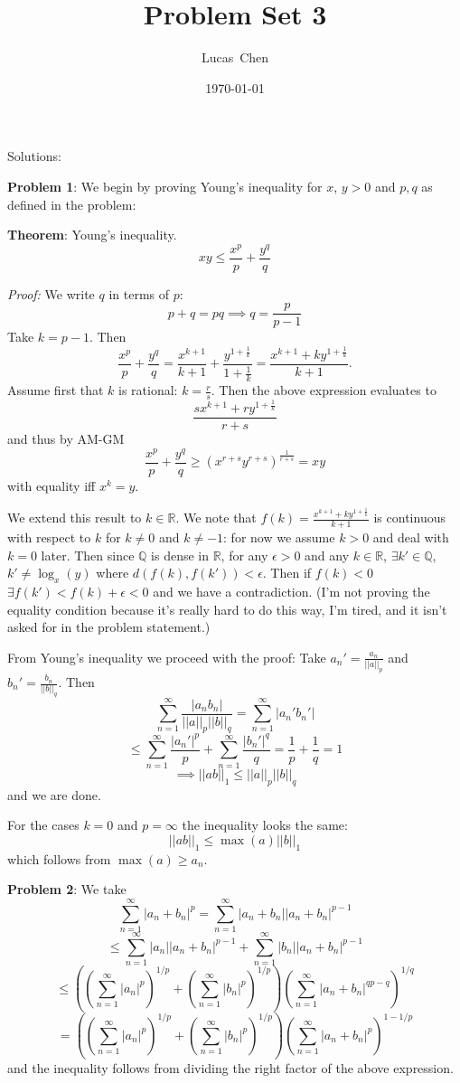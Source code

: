 \documentclass{amsart}
\title{Problem Set 3}
\author{Lucas\ Chen}
\date{\today}
\begin{document}
\maketitle

Solutions:

\medskip \noindent \textbf{Problem 1}:
We begin by proving Young's inequality for $x$, $y>0$ and $p, q$ as defined in the problem:

\medskip \noindent \textbf{Theorem}: Young's inequality. \[xy\leq\frac{x^p}{p}+\frac{y^q}{q}\]

\medskip \noindent \emph{Proof:}
We write $q$ in terms of $p$:
\[p+q=pq\implies q=\frac{p}{p-1}\]
Take $k=p-1$. Then \[\frac{x^p}{p}+\frac{y^q}{q}=\frac{x^{k+1}}{k+1}+\frac{y^{1+\frac{1}{k}}}{1+\frac{1}{k}}=\frac{x^{k+1}+ky^{1+\frac{1}{k}}}{k+1}.\]
Assume first that $k$ is rational: $k=\frac{r}{s}$. Then the above expression evaluates to \[\frac{sx^{k+1}+ry^{1+\frac{1}{k}}}{r+s}\]
and thus by AM-GM \[\frac{x^p}{p}+\frac{y^q}{q}\geq \left(x^{r+s}y^{r+s}\right)^{\frac{1}{r+s}}= xy\] with equality iff $x^k=y$. 

\medskip \noindent We extend this result to $k\in \mathbb{R}$. We note that $f
(k)=\frac{x^{k+1}+ky^{1+\frac{1}{k}}}{k+1}$ is continuous with respect to $k$ for $k\neq 0$ and $k\neq -1$: for now we assume $k>0$ and deal with $k=0$ later. Then since $\mathbb{Q}$ is dense in $\mathbb{R}$, for any $\epsilon>0$ and any $k\in \mathbb{R}$, $\exists k'\in \mathbb{Q}$, $k'\neq \log_x(y)$ where $d(f(k), f(k'))<\epsilon$. Then if $f(k)<0$ $\exists f(k')<f(k)+\epsilon<0$ and we have a contradiction. (I'm not proving the equality condition because it's really hard to do this way, I'm tired, and it isn't asked for in the problem statement.)

\medskip \noindent From Young's inequality we proceed with the proof: 
Take $a_n'=\frac{a_n}{||a||_p}$ and $b_n'=\frac{b_n}{||b||_q}$.
Then \[\sum_{n=1}^\infty \frac{|a_nb_n|}{||a||_p||b||_q}=\sum_{n=1}^\infty |a_n'b_n'|\] \[\leq\sum_{n=1}^\infty\frac{|a_n'|^p}{p}+\sum_{n=1}^\infty\frac{|b_n'|^q}{q}=\frac{1}{p}+\frac{1}{q}=1\]
\[\implies ||ab||_1\leq ||a||_p||b||_q\] and we are done.

\medskip \noindent For the cases $k=0$ and $p=\infty$ the inequality looks the same: \[||ab||_1\leq \max(a)||b||_1\]
which follows from $\max(a)\geq a_n$. 

\medskip \noindent \textbf{Problem 2}:
We take \[\sum_{n=1}^\infty|a_n+b_n|^p=\sum_{n=1}^\infty|a_n+b_n||a_n+b_n|^{p-1}\]
\[\leq \sum_{n=1}^\infty|a_n||a_n+b_n|^{p-1}+\sum_{n=1}^\infty|b_n||a_n+b_n|^{p-1}\]
\[\leq \left(\left(\sum_{n=1}^\infty|a_n|^p\right)^{1/p}+\left(\sum_{n=1}^\infty|b_n|^p\right)^{1/p}\right)\left(\sum_{n=1}^\infty|a_n+b_n|^{qp-q}\right)^{1/q}\]
\[= \left(\left(\sum_{n=1}^\infty|a_n|^p\right)^{1/p}+\left(\sum_{n=1}^\infty|b_n|^p\right)^{1/p}\right)\left(\sum_{n=1}^\infty|a_n+b_n|^{p}\right)^{1-1/p}\]
and the inequality follows from dividing the right factor of the above expression.
\end{document}
